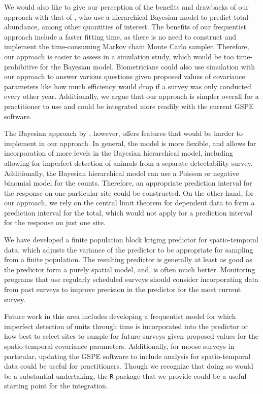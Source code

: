 \documentclass[]{interact}
\theoremstyle{plain}%
\theoremstyle{definition}
\theoremstyle{remark}
\begin{document}
We would also like to give our perception of the benefits and drawbacks
of our approach with that of \citet{schmidt2022bayesian}, who use a
hierarchical Bayesian model to predict total abundance, among other
quantities of interest. The benefits of our frequentist approach include
a faster fitting time, as there is no need to construct and implement
the time-consuming Markov chain Monte Carlo sampler. Therefore, our
approach is easier to assess in a simulation study, which would be too
time-prohibitive for the Bayesian model. Biometricians could also use
simulation with our approach to answer various questions given proposed
values of covariance parameters like how much efficiency would drop if a
survey was only conducted every other year. Additionally, we argue that
our approach is simpler overall for a practitioner to use and could be
integrated more readily with the current GSPE software.

The Bayesian approach by \citet{schmidt2022bayesian}, however, offers
features that would be harder to implement in our approach. In general,
the model is more flexible, and allows for incorporation of more levels
in the Bayesian hierarchical model, including allowing for imperfect
detection of animals from a separate detectability survey. Additionally,
the Bayesian hierarchical model can use a Poisson or negative binomial
model for the counts. Therefore, an appropriate prediction interval for
the response on one particular site could be constructed. On the other
hand, for our approach, we rely on the central limit theorem for
dependent data to form a prediction interval for the total, which would
not apply for a prediction interval for the response on just one site.

We have developed a finite population block kriging predictor for
spatio-temporal data, which adjusts the variance of the predictor to be
appropriate for sampling from a finite population. The resulting
predictor is generally at least as good as the predictor form a purely
spatial model, and, is often much better. Monitoring programs that use
regularly scheduled surveys should consider incorporating data from past
surveys to improve precision in the predictor for the most current
survey.

Future work in this area includes developing a frequentist model for
which imperfect detection of units through time is incorporated into the
predictor or how best to select sites to sample for future surveys given
proposed values for the spatio-temporal covariance parameters.
Additionally, for moose surveys in particular, updating the GSPE
software to include analysis for spatio-temporal data could be useful
for practitioners. Though we recognize that doing so would be a
substantial undertaking, the \texttt{R} package that we provide could be
a useful starting point for the integration.
\end{document}
